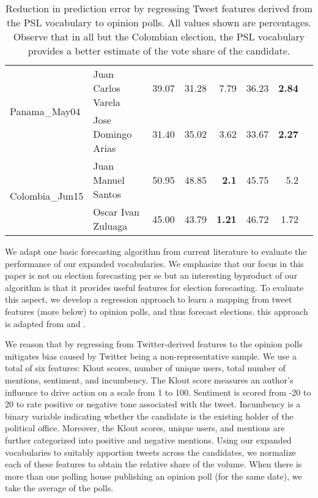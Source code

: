 \begin{table*}[ht]
\begin{tabular}{| l | l | r | r | r | r | r | r |}
		\hline
		\multirow{2}{*}{Panama\_May04} & Juan Carlos Varela & 39.07 &31.28  & 7.79 & 36.23  & \textbf{2.84}\\\cline{2-7}
																	& Jose Domingo Arias  & 31.40 & 35.02  & 3.62  & 33.67  & \textbf{2.27} \\
		\hline 											 
		\multirow{2}{*}{Colombia\_Jun15} & Juan Manuel Santos & 50.95 &48.85  & \textbf{2.1} & 45.75 & 5.2\\\cline{2-7}
																	& Oscar Ivan Zuluaga & 45.00 & 43.79 & \textbf{1.21} & 46.72  & 1.72 \\
		\hline
		\end{tabular}
		\caption{Reduction in prediction error by regressing Tweet
features derived from the PSL vocabulary to opinion polls. All values shown are percentages. Observe that in all but the Colombian election, the PSL vocabulary provides
a better estimate of the vote share of the candidate.}
		\label{table:trackRecord}
	\end{table*}	

We adapt one basic forecasting algorithm from current literature to evaluate the
performance of our expanded vocabularies. We emphasize that our focus in this paper is
not on election forecasting per se but an interesting byproduct of our algorithm is that
it provides useful features for election forecasting.
To evaluate this aspect, we develop
a regression approach
to
learn a mapping
from tweet features (more below) to opinion polls, and thus forecast elections. 
this approach is adapted from \cite{bermingham2011using} and \cite{o2010tweets}.

We reason that by regressing from Twitter-derived features to the opinion polls mitigates bias caused by Twitter being a non-representative sample.
We use a total of six features: Klout scores, number of unique users, total number of mentions, sentiment, and incumbency. The Klout score measures an author’s influence to drive action on a scale from 1 to 100. Sentiment is scored from -20 to 20 to rate positive or negative tone associated with the tweet. Incumbency is a binary variable indicating whether the candidate is the existing holder of the political office. Moreover, the Klout scores, unique users, and mentions are further categorized into positive and negative mentions.
Using our expanded vocabularies to suitably apportion tweets across the candidates,
we normalize each of these features to obtain the relative share of the volume. 
When there is more than one polling house publishing an opinion poll (for the same date), we take the average of the polls. 

